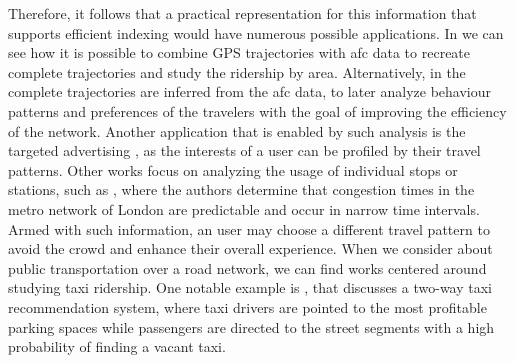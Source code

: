 \documentclass[a4paper,10pt,twoside]{book}
\begin{document}
	
	Therefore, it follows that a practical representation for this information that supports efficient indexing would have numerous possible applications. In \cite{tu2018spatial} we can see how it is possible to combine GPS trajectories with \gls{afc} data to recreate complete trajectories and study the ridership by area. Alternatively, in \cite{weng2018mining} the complete trajectories are inferred from the \gls{afc} data, to later analyze behaviour patterns and preferences of the travelers with the goal of improving the efficiency of the network. Another application that is enabled by such analysis is the targeted advertising \cite{zhang2017targeted}, as the interests of a user can be profiled by their travel patterns. Other works focus on analyzing the usage of individual stops or stations, such as \cite{ceapa2012avoiding}, where the authors determine that congestion times in the metro network of London are predictable and occur in narrow time intervals. Armed with such information, an user may choose a different travel pattern to avoid the crowd and enhance their overall experience. When we consider about public transportation over a road network, we can find works centered around studying taxi ridership. One notable example is \cite{yuan2013t}, that discusses a two-way taxi recommendation system, where taxi drivers are pointed to the most profitable parking spaces while passengers are directed to the street segments with a high probability of finding a vacant taxi.
	
\end{document}
